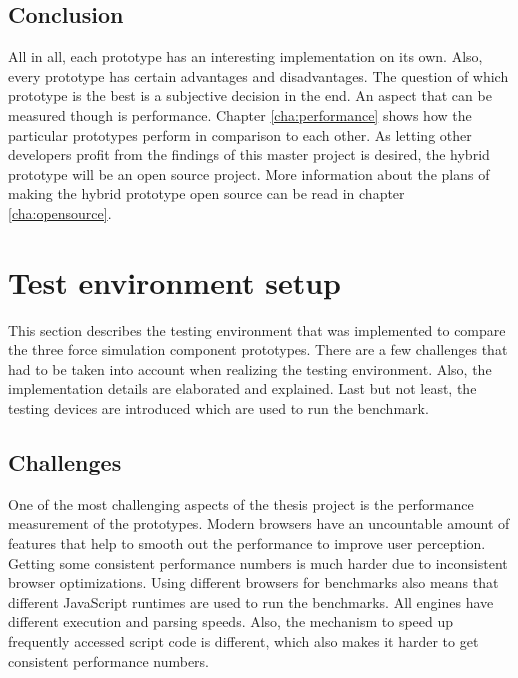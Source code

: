 \subsection{Conclusion}

All in all, each prototype has an interesting implementation on its own. Also, every prototype has certain advantages and disadvantages. The question of which prototype is the best is a subjective decision in the end. An aspect that can be measured though is performance. Chapter \ref{cha:performance} shows how the particular prototypes perform in comparison to each other. As letting other developers profit from the findings of this master project is desired, the hybrid prototype will be an open source project. More information about the plans of making the hybrid prototype open source can be read in chapter \ref{cha:opensource}.


\section{Test environment setup}

This section describes the testing environment that was implemented to compare the three force simulation component prototypes. There are a few challenges that had to be taken into account when realizing the testing environment. Also, the implementation details are elaborated and explained. Last but not least, the testing devices are introduced which are used to run the benchmark.

\subsection{Challenges}

One of the most challenging aspects of the thesis project is the performance measurement of the prototypes. Modern browsers have an uncountable amount of features that help to smooth out the performance to improve user perception. Getting some consistent performance numbers is much harder due to inconsistent browser optimizations. Using different browsers for benchmarks also means that different JavaScript runtimes are used to run the benchmarks. All engines have different execution and parsing speeds. Also, the mechanism to speed up frequently accessed script code is different, which also makes it harder to get consistent performance numbers.


